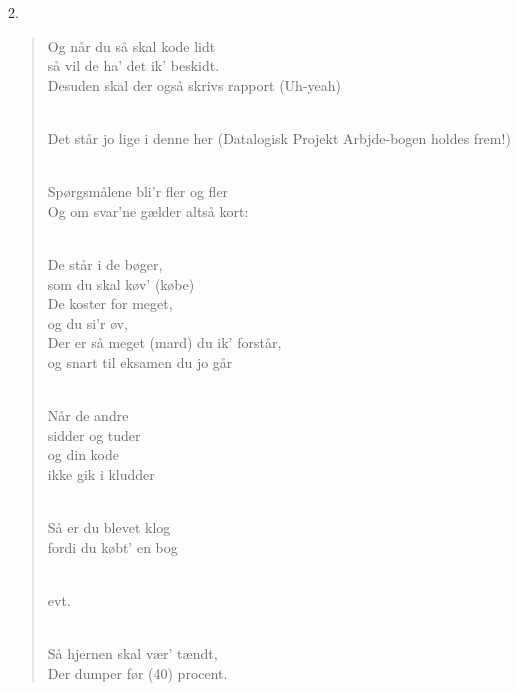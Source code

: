 \documentclass[a4paper,11pt]{article}
\begin{document}
2.
\begin{verse}
Og når du så skal kode lidt\\
   så vil de ha' det ik' beskidt.\\
   Desuden skal der også skrivs rapport (Uh-yeah)\\
\strut\\
   Det står jo lige i denne her (Datalogisk Projekt Arbjde-bogen holdes frem!)\strut\\
   Spørgsmålene bli'r fler og fler\\
   Og om svar'ne gælder altså kort:\\
\strut\\
   De står i de bøger,\\
   som du skal køv' (købe)\\
   De koster for meget,   \\
   og du si'r øv,\\
   Der er så meget (mard) du ik' forstår,\\
   og snart til eksamen du jo går\\
 \strut  \\
   Når de andre\\
   sidder og tuder\\
   og din kode\\
   ikke gik i kludder\\
\strut\\
   Så er du blevet klog\\
   fordi du købt' en bog\\
\strut\\
   evt.\\
\strut\\
   Så hjernen skal vær' tændt,\\
   Der dumper før (40) procent.\\
\end{verse}
\end{document}

